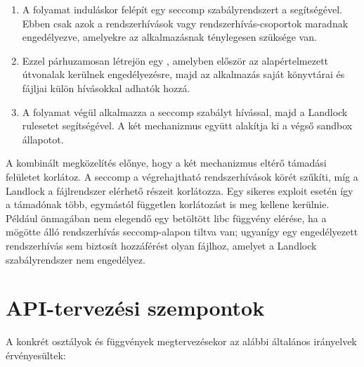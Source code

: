 \begin{enumerate}
  \item A folyamat induláskor felépít egy seccomp szabályrendszert a
   segítségével. Ebben csak azok a rendszerhívások vagy
  rendszerhívás-csoportok maradnak engedélyezve, amelyekre az alkalmazásnak
  ténylegesen szüksége van.

  \item Ezzel párhuzamosan létrejön egy , amelyben
  először az alapértelmezett útvonalak kerülnek engedélyezésre,
  majd az alkalmazás saját könyvtárai és
  fájljai külön  hívásokkal adhatók hozzá.

  \item A folyamat végül alkalmazza a seccomp szabályt
   hívással, majd a Landlock rulesetet
   segítségével. A két mechanizmus együtt
  alakítja ki a végső sandbox állapotot.
\end{enumerate}

A kombinált megközelítés előnye, hogy a két mechanizmus eltérő támadási
felületet korlátoz. A seccomp a végrehajtható rendszerhívások körét szűkíti,
míg a Landlock a fájlrendszer elérhető részeit korlátozza. Egy sikeres exploit
esetén így a támadónak több, egymástól független korlátozást is meg kellene
kerülnie. Például önmagában nem elegendő egy betöltött libc függvény
elérése, ha a mögötte álló rendszerhívás seccomp-alapon tiltva van; ugyanígy
egy engedélyezett rendszerhívás sem biztosít hozzáférést olyan fájlhoz, amelyet
a Landlock szabályrendszer nem engedélyez.

\section{API-tervezési szempontok}

A konkrét osztályok és függvények megtervezésekor az alábbi általános
irányelvek érvényesültek:

